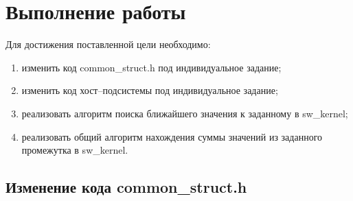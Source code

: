 \chapter{Выполнение работы}

Для достижения поставленной цели необходимо:
\begin{enumerate}
	\item изменить код common\_struct.h под индивидуальное задание;
	\item изменить код хост--подсистемы под индивидуальное задание;
	\item реализовать алгоритм поиска ближайшего значения к заданному в sw\_kernel;
	\item реализовать общий алгоритм нахождения суммы значений из заданного промежутка в sw\_kernel.
\end{enumerate}

\section{Изменение кода common\_struct.h}

